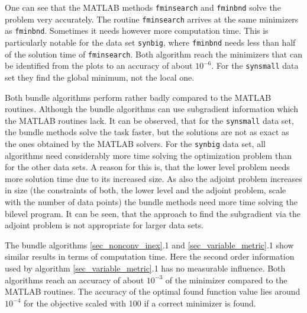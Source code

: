 One can see that the MATLAB methods \texttt{fminsearch} and \texttt{fminbnd} solve the problem very accurately.%
The routine \texttt{fminsearch} arrives at the same minimizers as \texttt{fminbnd}. Sometimes it needs however more computation time. This is particularly notable for the data set \texttt{synbig}, where \texttt{fminbnd} needs less than half of the solution time of \texttt{fminsearch}.
Both algorithm reach the minimizers that can be identified from the plots to an accuracy of about \(10^{-6}\). For the \texttt{synsmall} data set they find the global minimum, not the local one.

Both bundle algorithms perform rather badly compared to the MATLAB routines. Although the bundle algorithms can use subgradient information which the MATLAB routines lack.
It can be observed, that for the \texttt{synsmall} data set, the bundle methods solve the task faster, but the solutions are not as exact as the ones obtained by the MATLAB solvers.
For the \texttt{synbig} data set, all algorithms need considerably more time solving the optimization problem than for the other data sets.
A reason for this is, that the lower level problem needs more solution time due to its increased size.
As also the adjoint problem increases in size (the constraints of both, the lower level and the adjoint problem, scale with the number of data points) the bundle methods need more time solving the bilevel program.
It can be seen, that the approach to find the subgradient via the adjoint problem is not appropriate for larger data sets.

The bundle algorithms \ref{sec_nonconv_inex}.1 and \ref{sec_variable_metric}.1 show similar results in terms of computation time. Here the second order information used by algorithm \ref{sec_variable_metric}.1 has no measurable influence.
Both algorithms reach an accuracy of about \(10^{-3}\) of the minimizer compared to the MATLAB routines. The accuracy of the optimal found function value lies around \(10^{-4}\) for the objective scaled with 100 if a correct minimizer is found.




